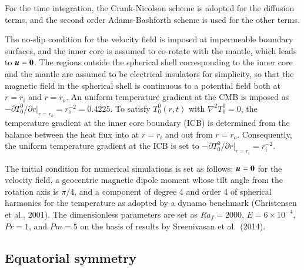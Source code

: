 For the time integration, the Crank-Nicolson scheme is adopted for the diffusion terms, and the second order Adams-Bashforth scheme is used for the other terms.

The no-slip condition for the velocity field is imposed at impermeable boundary surfaces, and the inner core is assumed to co-rotate with the mantle, which leads to $\mbox{\boldmath$u$} = {\bf 0}$.
The regions outside the spherical shell corresponding to the inner core and the mantle are assumed to be electrical insulators for simplicity, so that the magnetic field in the spherical shell is continuous to a potential field both at $r = r_i$ and $r = r_o$.
An uniform temperature gradient at the CMB is imposed as $-\partial T_0^0 / \partial r |_{r = r_o} = r_{o}^{-2} = 0.4225$. 
To satisfy $T_0^0 (r, t)$ with $\nabla^2 T_0^0 = 0$,
the temperature gradient at the inner core boundary (ICB) is determined from the balance between the heat flux into at $r = r_i$ and out from $r = r_o$. 
Consequently, the uniform temperature gradient at the ICB is set to $-\partial T_0^0 / \partial r |_{r = r_i} = r_i^{-2}$.

The initial condition for numerical simulations is set as follows; $\mbox{\boldmath$u$} = {\bf 0}$ for the velocity field, a geocentric magnetic dipole moment whose tilt angle from the rotation axis is $\pi / 4$, and a component of degree 4 and order 4 of spherical harmonics for the temperature as adopted by a dynamo benchmark (Christensen et al., 2001).
The dimensionless parameters are set as $Ra_f = 2000$, $E = 6 \times 10^{-4}$, $Pr = 1$, and $Pm = 5$ on the basis of results by Sreenivasan et al.\ (2014). %


\subsection{Equatorial symmetry}

